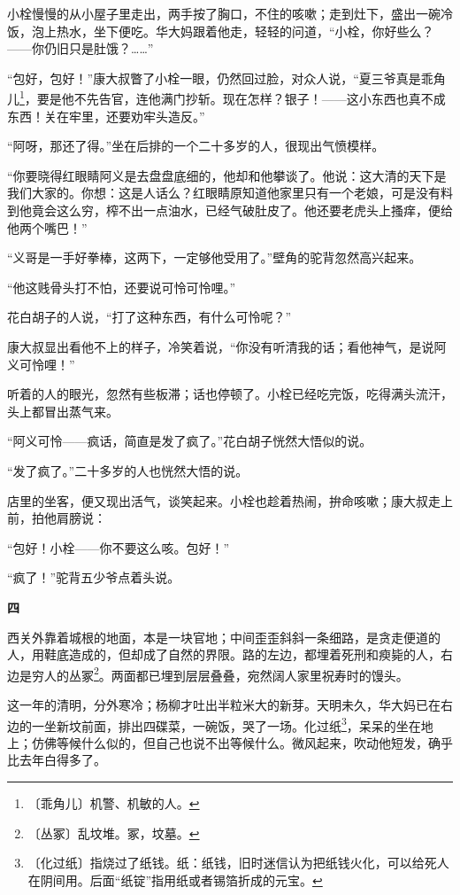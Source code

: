 \documentclass[12pt,UTF-8,openany]{ctexbook}
\begin{document}
\begin{large}
    小栓慢慢的从小屋子里走出，两手按了胸口，不住的咳嗽；走到灶下，盛出一碗冷饭，泡上热水，坐下便吃。华大妈跟着他走，轻轻的问道，“小栓，你好些么？——你仍旧只是肚饿？……”
    
    “包好，包好！”康大叔瞥了小栓一眼，仍然回过脸，对众人说，“夏三爷真是乖角儿\footnote{〔乖角儿〕机警、机敏的人。}，要是他不先告官，连他满门抄斩。现在怎样？银子！——这小东西也真不成东西！关在牢里，还要劝牢头造反。”
    
    “阿呀，那还了得。”坐在后排的一个二十多岁的人，很现出气愤模样。
    
    “你要晓得红眼睛阿义是去盘盘底细的，他却和他攀谈了。他说：这大清的天下是我们大家的。你想：这是人话么？红眼睛原知道他家里只有一个老娘，可是没有料到他竟会这么穷，榨不出一点油水，已经气破肚皮了。他还要老虎头上搔痒，便给他两个嘴巴！”
    
    “义哥是一手好拳棒，这两下，一定够他受用了。”壁角的驼背忽然高兴起来。
    
    “他这贱骨头打不怕，还要说可怜可怜哩。”
    
    花白胡子的人说，“打了这种东西，有什么可怜呢？”
    
    康大叔显出看他不上的样子，冷笑着说，“你没有听清我的话；看他神气，是说阿义可怜哩！”
    
    听着的人的眼光，忽然有些板滞；话也停顿了。小栓已经吃完饭，吃得满头流汗，头上都冒出蒸气来。
    
    “阿义可怜——疯话，简直是发了疯了。”花白胡子恍然大悟似的说。
    
    “发了疯了。”二十多岁的人也恍然大悟的说。
    
    店里的坐客，便又现出活气，谈笑起来。小栓也趁着热闹，拚命咳嗽；康大叔走上前，拍他肩膀说：
    
    “包好！小栓——你不要这么咳。包好！”
    
    “疯了！”驼背五少爷点着头说。
    
    \begin{center}\textbf{四}\end{center}
    
    西关外靠着城根的地面，本是一块官地；中间歪歪斜斜一条细路，是贪走便道的人，用鞋底造成的，但却成了自然的界限。路的左边，都埋着死刑和瘐毙的人，右边是穷人的丛冢\footnote{〔丛冢〕乱坟堆。冢，坟墓。}。两面都已埋到层层叠叠，宛然阔人家里祝寿时的馒头。
    
    这一年的清明，分外寒冷；杨柳才吐出半粒米大的新芽。天明未久，华大妈已在右边的一坐新坟前面，排出四碟菜，一碗饭，哭了一场。化过纸\footnote{〔化过纸〕指烧过了纸钱。纸：纸钱，旧时迷信认为把纸钱火化，可以给死人在阴间用。后面“纸锭”指用纸或者锡箔折成的元宝。}，呆呆的坐在地上；仿佛等候什么似的，但自己也说不出等候什么。微风起来，吹动他短发，确乎比去年白得多了。
    

\end{large}
\end{document}
